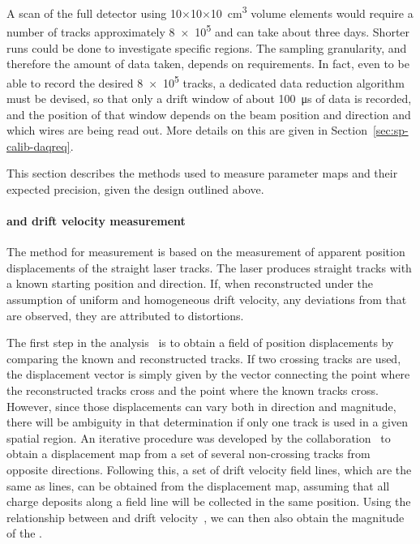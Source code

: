A scan of the full detector using \num{10}$\times$\num{10}$\times$\SI{10}{\cubic\cm}
volume elements would require a number of tracks approximately \num{8e5} 
and can take about three days. Shorter runs could be done to investigate specific regions. The sampling granularity, and therefore the amount of data taken, depends on  requirements. In fact, even to be able to record the desired \num{8e5} tracks, a dedicated data reduction algorithm must be devised, so that only a drift window of about \SI{100}{\micro\s}
of data is recorded, and the position of that window depends on the beam position and direction and which wires are being read out. More details on this are given in Section~\ref{sec:sp-calib-daqreq}.






\label{sec:sp-calib-sys-las-ion-meas}

This section describes the methods used to measure 
parameter maps and their expected precision, given the design outlined above.

\paragraph{\efield and drift velocity measurement}
The method for \efield measurement is based on the measurement of apparent position displacements of the straight laser tracks. The laser produces straight tracks with a known starting position and direction. If, when reconstructed under the assumption of uniform and homogeneous drift velocity, any deviations from that are observed, they are attributed to \efield distortions. 

The first step in the analysis~\cite{bib:uBlaser2019} is to obtain a field of position displacements by comparing the known and reconstructed tracks. If two crossing tracks are used, the displacement vector is simply given by the vector connecting the point where the reconstructed tracks cross and the point where the known tracks cross. However, since those displacements can vary both in direction and magnitude, there will be ambiguity in that determination if only one track is used in a given spatial region. An iterative procedure was developed by the  collaboration~\cite{bib:chen2018,bib:uBlaser2019} to obtain a displacement map from a set of several non-crossing tracks from opposite directions. Following this, a set of drift velocity field lines, which are the same as \efield lines, can be obtained from the displacement map, assuming that all charge deposits along a field line will be collected in the same position. Using the relationship between \efield and drift velocity~\cite{Li:2015rqa,Walkowiak:2000wf}, we can then also obtain the magnitude of the \efield.

